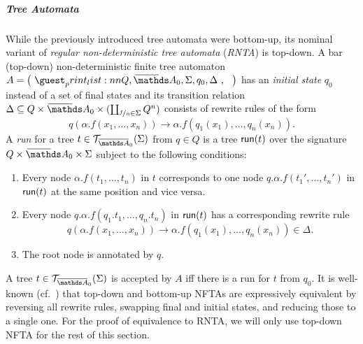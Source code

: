 \documentclass[a4paper,UKenglish,cleveref,autoref,thm-restate,numberwithinsect,final]{lipics-v2021}
\begin{document}
    \subparagraph*{Tree Automata} While the previously introduced tree automata were bottom-up, its nominal
    variant of \emph{regular non-deterministic tree automata} (\emph{RNTA}) is top-down. A bar (top-down)
    non-deterministic finite tree automaton $A = \maketuple{Q, \barNames_0, \Sigma, q_0, \Delta}$ has an
    \emph{initial state} $q_0$ instead of a set of final states and its transition relation $\Delta \seq
    Q \times \barNames_0 \times (\coprod_{\nicefrac{f}{n} \in \Sigma} Q^n)$ consists of rewrite rules
    of the form \[ q(\alpha.f(x_1, \dots, x_n)) \to \alpha.f(q_1(x_1), \dots, q_n(x_n)). \]
    A \emph{run} for a tree $t \in \bartree[\barNamess_0](\Sigma)$ from $q \in Q$ is a tree $\textsf{run}(t)$ over the signature
    $Q \times \barNames_0 \times \Sigma$ subject to the following conditions:
    \begin{enumerate}
      \item Every node $\alpha.f(t_1, \dots, t_n)$ in $t$ corresponds to one node
        $q.\alpha.f(t_1', \dots,  t_n')$ in $\textsf{run}(t)$ at the same position and vice versa.\label{run:cond:A}
      \item Every node $q.\alpha.f(q_1.t_1, \dots, q_n.t_n)$ in $\textsf{run}(t)$ has a corresponding rewrite
        rule\label{run:cond:B} \[q(\alpha.f(x_1, \dots, x_n)) \to \alpha.f(q_1(x_1), \dots, q_n(x_n)) \in \Delta. \]
      \item The root node is annotated by $q$.\label{run:cond:C}
    \end{enumerate}
    A tree $t \in \bartree[\barNamess_0](\Sigma)$ is accepted by $A$ iff there is a run for $t$ from $q_0$.
    It is well-known (cf.~\cite[Thm.~8]{tata08}) that top-down and bottom-up NFTAs are expressively equivalent by
    reversing all rewrite rules, swapping final and initial states, and reducing those to a single one. 
    For the proof of equivalence to RNTA, we will only use top-down NFTA for the rest of this section.
    
\end{document}
